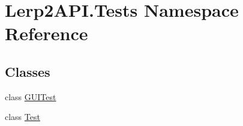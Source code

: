 \hypertarget{namespace_lerp2_a_p_i_1_1_tests}{}\section{Lerp2\+A\+P\+I.\+Tests Namespace Reference}
\label{namespace_lerp2_a_p_i_1_1_tests}
\subsection*{Classes}
\begin{DoxyCompactItemize}
\item 
class \hyperlink{class_lerp2_a_p_i_1_1_tests_1_1_g_u_i_test}{G\+U\+I\+Test}
\item 
class \hyperlink{class_lerp2_a_p_i_1_1_tests_1_1_test}{Test}
\end{DoxyCompactItemize}

